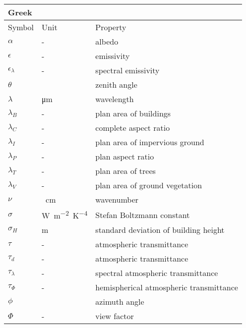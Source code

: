 \begin{table}[H]
	\centering
	\begin{tabular}{p{1.5cm}p{3cm}p{10cm}}
		Greek &&\\
		\toprule
		Symbol & Unit & Property \\
		\midrule
		$\alpha $ & - & albedo \\
		$\epsilon$ & - & emissivity \\
		$\epsilon_\lambda$ & - & spectral emissivity \\
		$\theta$ & \si{\deg} & zenith angle \\
		$\lambda$ & \si{\micro\meter} & wavelength \\
		$\lambda_B $ & - & plan area of buildings \\
		$\lambda_C $ &- & complete aspect ratio \\
		$\lambda_I $ & -& plan area of impervious ground \\
		$ \lambda_P$ & -& plan aspect ratio\\
		$ \lambda_T $ & -& plan area of trees \\
		$ \lambda_V$ & -& plan area of ground vegetation \\
		$\nu$ & \si{\per\centi\meter} & wavenumber \\
		$\sigma$ & \si{\watt\meter^{-2}\kelvin^{-4}} & Stefan Boltzmann constant \\
		$\sigma_H $ & \si{\meter} & standard deviation of building height \\
		$\tau $ & - & atmospheric transmittance \\ 
		$\tau_d $ & - & atmospheric transmittance \\ 
		$\tau_\lambda $ & - & spectral atmospheric transmittance \\ 
		$\tau_{\Phi} $ & - & hemispherical  atmospheric transmittance \\ 
		$\phi$ & \si{\deg} & azimuth angle \\
		$\Phi $ & - & view factor \\
		\bottomrule
	\end{tabular} 
\end{table}

\captionsetup[table]{list=yes}

\cleardoublepage
{}		%

\renewcommand{\headrulewidth}{0pt}
\pagestyle{fancy}
\fancyhf{}
\rhead{\thepage}
\makeatletter
\let\ps@plain\ps@fancy %
\makeatother

